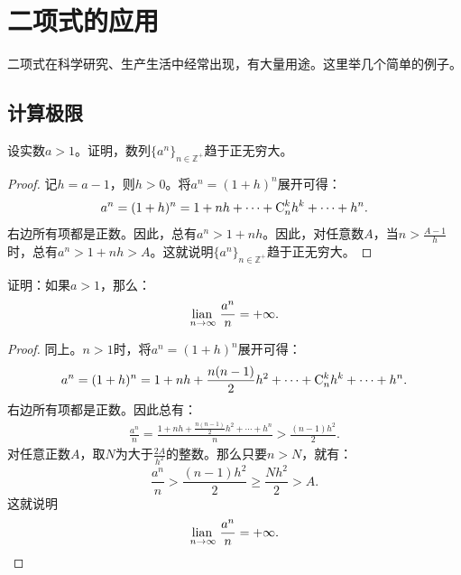 \documentclass[12pt,UTF8,fontset=none]{ctexbook}
\begin{document}
\section{二项式的应用}

二项式在科学研究、生产生活中经常出现，有大量用途。这里举几个简单的例子。

\subsection{计算极限}

\begin{et}
    设实数$a>1$。证明，数列$\{a^n\}_{n\in\mathbb{Z}^+}$趋于正无穷大。
\end{et}

\begin{proof}
    记$h = a - 1$，则$h>0$。将$a^n = (1 + h)^n$展开可得：
    $$ a^n = (1+h)^n = 1 + nh + \cdots +  \mathrm{C}_{n}^{k}h^k + \cdots + h^n.$$
    右边所有项都是正数。因此，总有$a^n > 1+nh$。因此，对任意数$A$，当$n>\frac{A-1}{h}$时，总有$a^n>1+nh>A$。这就说明$\{a^n\}_{n\in\mathbb{Z}^+}$趋于正无穷大。
\end{proof}

\begin{et}
    证明：如果$a>1$，那么：
    $$ \underset{n\to\infty}{\operatorname{lian}\,}\; \frac{a^n}{n} = +\infty.$$
\end{et}
\begin{proof}
    同上。$n > 1$时，将$a^n = (1 + h)^n$展开可得：
    $$ a^n = (1 + h)^n = 1 + nh + \frac{n(n-1)}{2}h^2 + \cdots + \mathrm{C}_{n}^{k}h^k + \cdots + h^n.$$
    右边所有项都是正数。因此总有：
    \begin{align*}
        \frac{a^n}{n} = \frac{1 + nh + \frac{n(n-1)}{2}h^2 + \cdots + h^n}{n} > \frac{(n-1)h^2}{2}.
    \end{align*}
    对任意正数$A$，取$N$为大于$\frac{2A}{h^2}$的整数。那么只要$n>N$，就有：
    $$ \frac{a^n}{n} > \frac{(n-1)h^2}{2} \geqslant \frac{Nh^2}{2} > A. $$
    这就说明
    $$ \underset{n\to\infty}{\operatorname{lian}\,}\; \frac{a^n}{n} = +\infty.$$
\end{proof}
\end{document}
